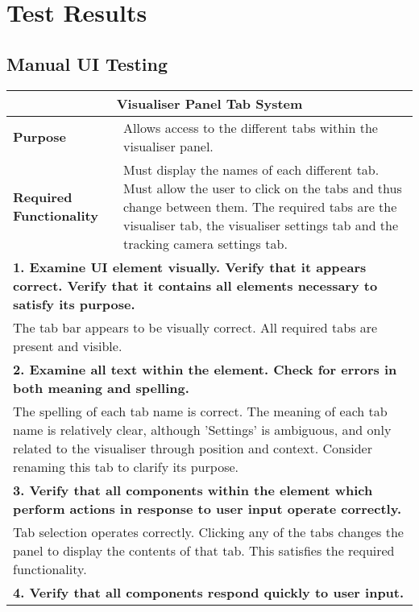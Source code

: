 
\chapter{Test Results} %

\section{Manual UI Testing} \label{app:UITestResults}

\begin{longtable}{ l p{10cm} }
 \hline
 \multicolumn{2}{c}{\textbf{Visualiser Panel Tab System}}\\
 \hline
 \textbf{Purpose} & Allows access to the different tabs within the visualiser panel.\\
 \textbf{Required Functionality} & Must display the names of each different tab. Must allow the user to click on the tabs and thus change between them. The required tabs are the visualiser tab, the visualiser settings tab and the tracking camera settings tab.\\
 \hline
 \multicolumn{2}{p{14cm}}{\textbf{1. Examine UI element visually. Verify that it appears correct. Verify that it contains all elements necessary to satisfy its purpose.}}\\
 \multicolumn{2}{p{14cm}}{The tab bar appears to be visually correct. All required tabs are present and visible.}\\
 \hline
 \multicolumn{2}{p{14cm}}{\textbf{2. Examine all text within the element. Check for errors in both meaning and spelling.}}\\
 \multicolumn{2}{p{14cm}}{The spelling of each tab name is correct. The meaning of each tab name is relatively clear, although 'Settings' is ambiguous, and only related to the visualiser through position and context. Consider renaming this tab to clarify its purpose.}\\
 \hline
 \multicolumn{2}{p{14cm}}{\textbf{3. Verify that all components within the element which perform actions in response to user input operate correctly.}}\\
 \multicolumn{2}{p{14cm}}{Tab selection operates correctly. Clicking any of the tabs changes the panel to display the contents of that tab. This satisfies the required functionality.}\\
 \hline
 \multicolumn{2}{p{14cm}}{\textbf{4. Verify that all components respond quickly to user input.}}\\

\end{longtable}
